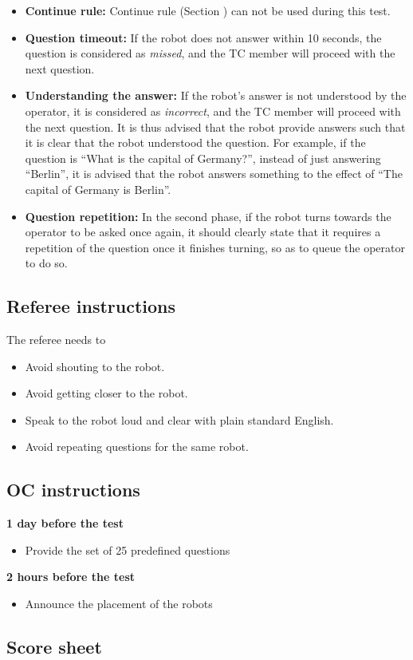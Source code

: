 \begin{itemize}
\item \textbf{Continue rule:} Continue rule (Section ) can not be used during this test.
\item \textbf{Question timeout:} If the robot does not answer within 10 seconds, the question is considered as \textit{missed}, and the TC member will proceed with the next question.
\item \textbf{Understanding the answer:} If the robot's answer is not understood by the operator, it is considered as \textit{incorrect}, and the TC member will proceed with the next question. It is thus advised that the robot provide answers such that it is clear that the robot understood the question. For example, if the question is ``What is the capital of Germany?'', instead of just answering ``Berlin'', it is advised that the robot answers something to the effect of ``The capital of Germany is Berlin''.
\item \textbf{Question repetition:} In the second phase, if the robot turns towards the operator to be asked once again, it should clearly state that it requires a repetition of the question once it finishes turning, so as to queue the operator to do so.
\end{itemize}

\subsection{Referee instructions}

The referee needs to
\begin{itemize}
\item Avoid shouting to the robot.
\item Avoid getting closer to the robot.
\item Speak to the robot loud and clear with plain standard English.
\item Avoid repeating questions for the same robot.
\end{itemize}

\subsection{OC instructions}

\textbf{1 day before the test}
\begin{itemize}
\item Provide the set of 25 predefined questions
\end{itemize}
\textbf{2 hours before the test}
\begin{itemize}
\item Announce the placement of the robots
\end{itemize}

\subsection{Score sheet}


